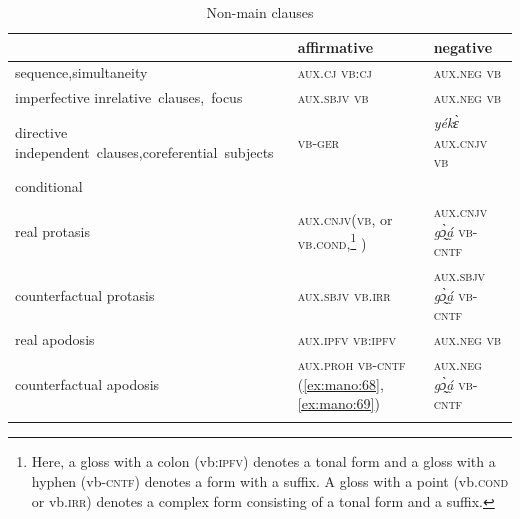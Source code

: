 \documentclass[output=paper,colorlinks,citecolor=brown]{langscibook}
\begin{document}
\begin{table}
\begin{tabularx}{.9\textwidth}{p{32mm}QQ@{}}
    \lsptoprule
& {\bfseries affirmative}   & {\bfseries negative}\\
\midrule
sequence,\newline simultaneity                                  & \textsc{aux.cj vb:cj}    & \textsc{aux.neg vb}\\
\tablevspace
    imperfective in\newline  \mbox{relative clauses, focus}                 & \textsc{aux.sbjv vb}       & \textsc{aux.neg vb}\\
\tablevspace
    directive in\newline  dependent~clauses,\newline \mbox{coreferential subjects}  & \textsc{vb-ger}            & \textit{yékɛ̀} \textsc{aux.cnjv} \textsc{vb}\\
\tablevspace
    conditional                                             &                           & \\
    \hspace*{3mm}real protasis               & \textsc{aux.cnjv}\newline (\textsc{vb},  or \textsc{vb.cond},\footnote{Here, a gloss with a colon (vb:\textsc{ipfv}) denotes a tonal form and a gloss with a hyphen (vb-\textsc{cntf}) denotes a form with a suffix. A gloss with a point (vb.\textsc{cond} or vb.\textsc{irr}) denotes a complex form consisting of a tonal form and a suffix.} )  & \textsc{aux.cnjv} \textit{gɔ̰̀á̰} \textsc{vb-cntf} \\
\tablevspace
    \hspace*{3mm}counterfactual \hspace*{3mm}protasis     & \textsc{aux.sbjv} \textsc{vb.irr}\newline \textsc{}                   & \textsc{aux.sbjv} \textit{gɔ̰̀á̰} \textsc{vb-cntf}  \\
\tablevspace
    \hspace*{3mm}real apodosis               & \textsc{aux.ipfv} \textsc{vb:ipfv}                             & \textsc{aux.neg} \textsc{vb}  \textsc{}\\
\tablevspace
    \hspace*{3mm}counterfactual \hspace*{3mm}apodosis     & \textsc{aux.proh} \textsc{vb-cntf} (\ref{ex:mano:68}, \ref{ex:mano:69})     & \textsc{aux.neg} \textit{gɔ̰̀á̰} \textsc{vb-cntf} \\
    \lspbottomrule
\end{tabularx}
\caption{Non-main clauses}
\label{tab:mano:4}
\end{table}
\end{document}
